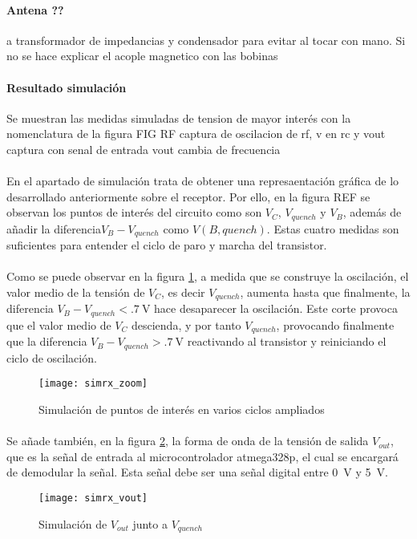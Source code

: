 \paragraph{Antena ??} 
a transformador de impedancias  y condensador para evitar al tocar con mano. Si no se hace explicar el acople magnetico con las bobinas

\paragraph{Resultado simulaci\'on} Se muestran las medidas simuladas de tension de mayor inter\'es con la nomenclatura de la figura FIG RF
captura de oscilacion de rf, v en rc y vout
captura con senal de entrada vout cambia de frecuencia

\paragraph{}
En el apartado de simulación trata de obtener una represaentación gráfica de lo desarrollado anteriormente sobre el receptor. Por ello, en la figura REF se observan los puntos de interés del circuito como son $V_C$, $V_{quench}$ y $V_{B}$, además de añadir la diferencia$V_B - V_{quench}$ como $V(B,quench)$. Estas cuatro medidas son suficientes para entender el ciclo de paro y marcha del transistor.
\paragraph{}
Como se puede observar en la figura \ref{fig:simrx_zoom}, a medida que se construye la oscilación, el valor medio de la tensión de $V_{C}$, es decir $V_{quench}$, aumenta hasta que finalmente, la diferencia $V_B - V_{quench} < \SI{.7}{\volt}$ hace desaparecer la oscilaci\'on. Este corte provoca que el valor medio de $V_C$ descienda, y por tanto $V_{quench}$, provocando finalmente que la diferencia $V_B - V_{quench} > \SI{.7}{\volt}$ reactivando al transistor y reiniciando el ciclo de oscilaci\'on.

\begin{figure}[h]
    \centering
    \texttt{[image: simrx\_zoom]}
    \caption{Simulación de puntos de interés en varios ciclos ampliados}
    \label{fig:simrx_zoom}
\end{figure}

\paragraph{}
Se añade también, en la figura \ref{fig:simrx_vout}, la forma de onda de la tensión de salida $V_{out}$, que es la señal de entrada al microcontrolador atmega328p, el cual se encargará de demodular la señal. Esta señal debe ser una señal digital entre \SI{0}{\volt} y \SI{5}{\volt}.
\begin{figure}[h]
    \centering
    \texttt{[image: simrx\_vout]}
    \caption{Simulación de $V_{out}$ junto a $V_{quench}$}
    \label{fig:simrx_vout}
\end{figure}

